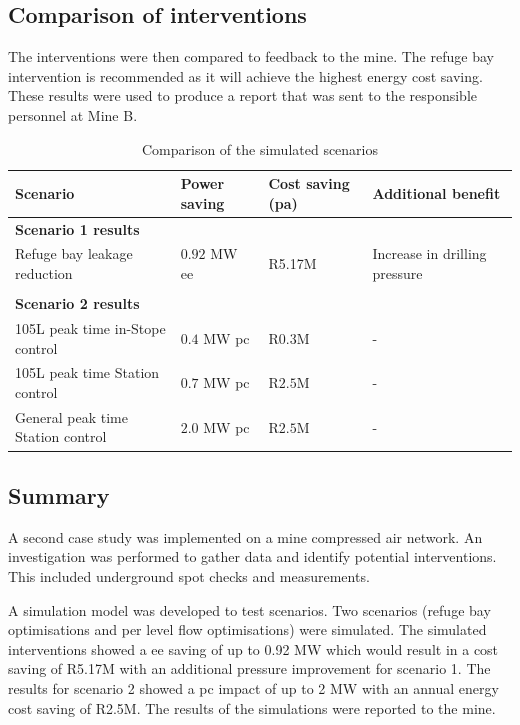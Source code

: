 	\subsection{Comparison of interventions}
	The interventions were then compared to feedback to the mine. The refuge bay intervention is recommended as it will achieve the highest energy cost saving. These results were used to produce a report that was sent to the responsible personnel at Mine B.
	\begin{table}[h!]
		\centering
		\begin{tabular}{p{}
				p{}
				p{}
				p{}}
			\hline 
			 \vspace{0.5em}Scenario & \vspace{0.5em}Power saving & Cost saving (\gls{pa}) & \vspace{0.5em}Additional benefit \\
			\hline
			\multicolumn{4}{l}{\textbf{Scenario 1 results}} \\
			Refuge bay leakage reduction & $ 0.92 $ MW \gls{ee} & R5.17M & Increase in drilling pressure \\
			 \\
			\multicolumn{4}{l}{\textbf{Scenario 2 results}} \\
			105L peak time in-Stope control & $ 0.4 $ MW \gls{pc} & R$ 0.3 $M& - \\
			105L peak time Station control & $ 0.7 $ MW \gls{pc} & R$ 2.5 $M& - \\
			General peak time Station control & $ 2.0 $ MW \gls{pc} & R$ 2.5 $M& - \\
			\hline 
		\end{tabular}
		\caption{Comparison of the simulated scenarios}
		\label{Table: B Comparison}
	\end{table}
	\subsection{Summary}
	A second case study was implemented on a mine compressed air network. An investigation was performed to gather data and identify potential interventions. This included underground spot checks and measurements.
	\par 
	 A simulation model was developed to test scenarios. Two scenarios (refuge bay optimisations and per level flow optimisations) were simulated. The simulated interventions showed a \gls{ee} saving of up to 0.92 MW which would result in a cost saving of R5.17M with an additional pressure improvement for scenario 1. The results for scenario 2 showed a \gls{pc} impact of up to 2 MW with an annual energy cost saving of R2.5M. The results of the simulations were reported to the mine.
